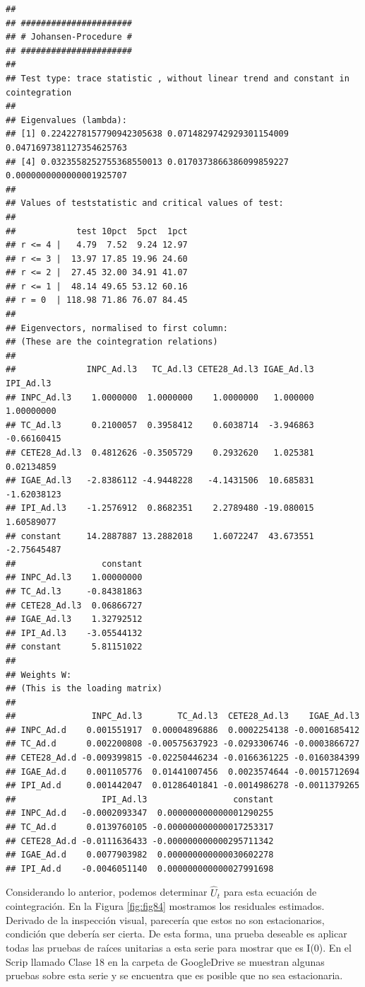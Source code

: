 \documentclass[
]{book}
\begin{document}
\begin{verbatim}
## 
## ###################### 
## # Johansen-Procedure # 
## ###################### 
## 
## Test type: trace statistic , without linear trend and constant in cointegration 
## 
## Eigenvalues (lambda):
## [1] 0.2242278157790942305638 0.0714829742929301154009 0.0471697381127354625763
## [4] 0.0323558252755368550013 0.0170373866386099859227 0.0000000000000001925707
## 
## Values of teststatistic and critical values of test:
## 
##            test 10pct  5pct  1pct
## r <= 4 |   4.79  7.52  9.24 12.97
## r <= 3 |  13.97 17.85 19.96 24.60
## r <= 2 |  27.45 32.00 34.91 41.07
## r <= 1 |  48.14 49.65 53.12 60.16
## r = 0  | 118.98 71.86 76.07 84.45
## 
## Eigenvectors, normalised to first column:
## (These are the cointegration relations)
## 
##              INPC_Ad.l3   TC_Ad.l3 CETE28_Ad.l3 IGAE_Ad.l3   IPI_Ad.l3
## INPC_Ad.l3    1.0000000  1.0000000    1.0000000   1.000000  1.00000000
## TC_Ad.l3      0.2100057  0.3958412    0.6038714  -3.946863 -0.66160415
## CETE28_Ad.l3  0.4812626 -0.3505729    0.2932620   1.025381  0.02134859
## IGAE_Ad.l3   -2.8386112 -4.9448228   -4.1431506  10.685831 -1.62038123
## IPI_Ad.l3    -1.2576912  0.8682351    2.2789480 -19.080015  1.60589077
## constant     14.2887887 13.2882018    1.6072247  43.673551 -2.75645487
##                 constant
## INPC_Ad.l3    1.00000000
## TC_Ad.l3     -0.84381863
## CETE28_Ad.l3  0.06866727
## IGAE_Ad.l3    1.32792512
## IPI_Ad.l3    -3.05544132
## constant      5.81151022
## 
## Weights W:
## (This is the loading matrix)
## 
##               INPC_Ad.l3       TC_Ad.l3  CETE28_Ad.l3    IGAE_Ad.l3
## INPC_Ad.d    0.001551917  0.00004896886  0.0002254138 -0.0001685412
## TC_Ad.d      0.002200808 -0.00575637923 -0.0293306746 -0.0003866727
## CETE28_Ad.d -0.009399815 -0.02250446234 -0.0166361225 -0.0160384399
## IGAE_Ad.d    0.001105776  0.01441007456  0.0023574644 -0.0015712694
## IPI_Ad.d     0.001442047  0.01286401841 -0.0014986278 -0.0011379265
##                 IPI_Ad.l3                 constant
## INPC_Ad.d   -0.0002093347  0.000000000000001290255
## TC_Ad.d      0.0139760105 -0.000000000000017253317
## CETE28_Ad.d -0.0111636433 -0.000000000000295711342
## IGAE_Ad.d    0.0077903982  0.000000000000030602278
## IPI_Ad.d    -0.0046051140  0.000000000000027991698
\end{verbatim}

Considerando lo anterior, podemos determinar \(\hat{U}_t\) para esta ecuación de cointegración. En la Figura \ref{fig:fig84} mostramos los residuales estimados. Derivado de la inspección visual, parecería que estos no son estacionarios, condición que debería ser cierta. De esta forma, una prueba deseable es aplicar todas las pruebas de raíces unitarias a esta serie para mostrar que es I(0). En el Scrip llamado Clase 18 en la carpeta de GoogleDrive se muestran algunas pruebas sobre esta serie y se encuentra que es posible que no sea estacionaria.
\end{document}
